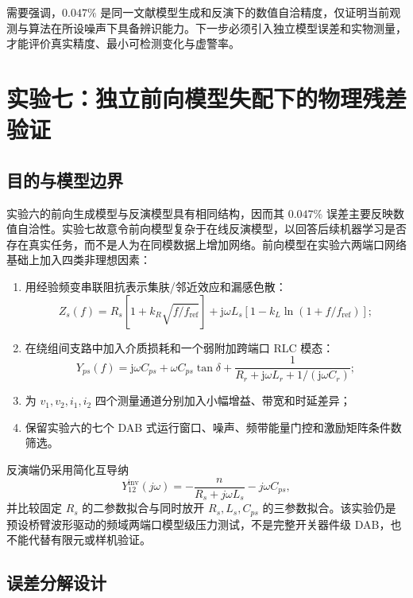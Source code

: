 \documentclass[UTF8,a4paper,12pt]{ctexart}
\begin{document}
需要强调，$0.047\%$ 是同一文献模型生成和反演下的数值自洽精度，仅证明当前观测与算法在所设噪声下具备辨识能力。下一步必须引入独立模型误差和实物测量，才能评价真实精度、最小可检测变化与虚警率。

\section{实验七：独立前向模型失配下的物理残差验证}

\subsection{目的与模型边界}

实验六的前向生成模型与反演模型具有相同结构，因而其 $0.047\%$ 误差主要反映数值自洽性。实验七故意令前向模型复杂于在线反演模型，以回答后续机器学习是否存在真实任务，而不是人为在同模数据上增加网络。前向模型在实验六两端口网络基础上加入四类非理想因素：

\begin{enumerate}
  \item 用经验频变串联阻抗表示集肤/邻近效应和漏感色散：
  \begin{equation}
  Z_s(f)=R_s\left[1+k_R\sqrt{f/f_{\mathrm{ref}}}\right]
  +\mathrm{j}\omega L_s\left[1-k_L\ln(1+f/f_{\mathrm{ref}})\right];
  \end{equation}
  \item 在绕组间支路中加入介质损耗和一个弱附加跨端口 RLC 模态：
  \begin{equation}
  Y_{ps}(f)=\mathrm{j}\omega C_{ps}+\omega C_{ps}\tan\delta
  +\frac{1}{R_r+\mathrm{j}\omega L_r+1/(\mathrm{j}\omega C_r)};
  \end{equation}
  \item 为 $v_1,v_2,i_1,i_2$ 四个测量通道分别加入小幅增益、带宽和时延差异；
  \item 保留实验六的七个 DAB 式运行窗口、噪声、频带能量门控和激励矩阵条件数筛选。
\end{enumerate}

反演端仍采用简化互导纳
\begin{equation}
Y_{12}^{\mathrm{inv}}(j\omega)
=-
\frac{n}{R_s+j\omega L_s}
-j\omega C_{ps},
\end{equation}
并比较固定 $R_s$ 的二参数拟合与同时放开 $R_s,L_s,C_{ps}$ 的三参数拟合。该实验仍是预设桥臂波形驱动的频域两端口模型级压力测试，不是完整开关器件级 DAB，也不能代替有限元或样机验证。

\subsection{误差分解设计}
\end{document}
